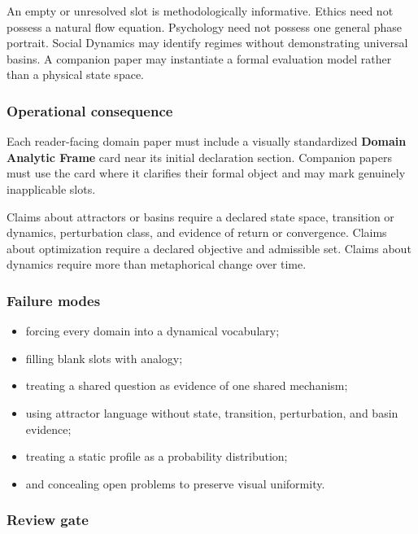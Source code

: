 \documentclass[
  11pt,
]{article}
\providecommand{\tightlist}{%
  \setlength{\itemsep}{0pt}\setlength{\parskip}{0pt}}
\begin{document}
An empty or unresolved slot is methodologically informative. Ethics need
not possess a natural flow equation. Psychology need not possess one
general phase portrait. Social Dynamics may identify regimes without
demonstrating universal basins. A companion paper may instantiate a
formal evaluation model rather than a physical state space.

\subsubsection{Operational
consequence}\label{operational-consequence-20}

Each reader-facing domain paper must include a visually standardized
\textbf{Domain Analytic Frame} card near its initial declaration
section. Companion papers must use the card where it clarifies their
formal object and may mark genuinely inapplicable slots.

Claims about attractors or basins require a declared state space,
transition or dynamics, perturbation class, and evidence of return or
convergence. Claims about optimization require a declared objective and
admissible set. Claims about dynamics require more than metaphorical
change over time.

\subsubsection{Failure modes}\label{failure-modes-11}

\begin{itemize}
\tightlist
\item
  forcing every domain into a dynamical vocabulary;
\item
  filling blank slots with analogy;
\item
  treating a shared question as evidence of one shared mechanism;
\item
  using attractor language without state, transition, perturbation, and
  basin evidence;
\item
  treating a static profile as a probability distribution;
\item
  and concealing open problems to preserve visual uniformity.
\end{itemize}

\subsubsection{Review gate}\label{review-gate-3}
\end{document}
